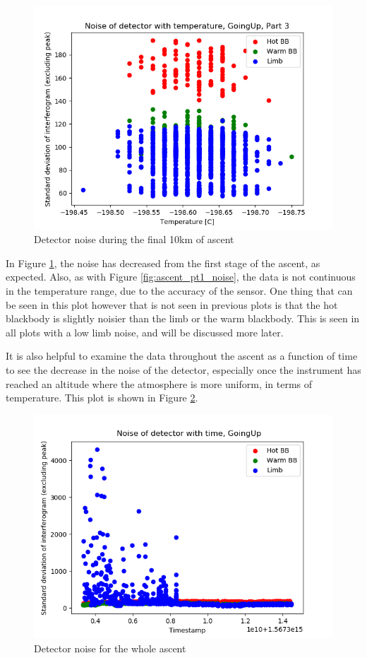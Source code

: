\begin{figure}[ht]
\centering
  \includegraphics[width=0.8\linewidth]{mct_noise_temp_plots/goingup_pt3_noisevtemp_invertedx_colour.png}
  \caption{Detector noise during the final 10km of ascent}
  \label{fig:ascent_pt3_noise}
\end{figure}

In Figure \ref{fig:ascent_pt3_noise}, the noise has decreased from the first stage of the ascent, as expected. Also, as with Figure \ref{fig:ascent_pt1_noise}, the data is not continuous in the temperature range, due to the accuracy of the sensor. One thing that can be seen in this plot however that is not seen in previous plots is that the hot blackbody is slightly noisier than the limb or the warm blackbody. This is seen in all plots with a low limb noise, and will be discussed more later.

It is also helpful to examine the data throughout the ascent as a function of time to see the decrease in the noise of the detector, especially once the instrument has reached an altitude where the atmosphere is more uniform, in terms of temperature. This plot is shown in Figure \ref{fig:ascent_noisetime}.

\begin{figure}[ht]
\centering
  \includegraphics[width=0.8\linewidth]{mct_noise_temp_plots/goingup_allparts_noisevtime_colour.png}
  \caption{Detector noise for the whole ascent}
  \label{fig:ascent_noisetime}
\end{figure}

